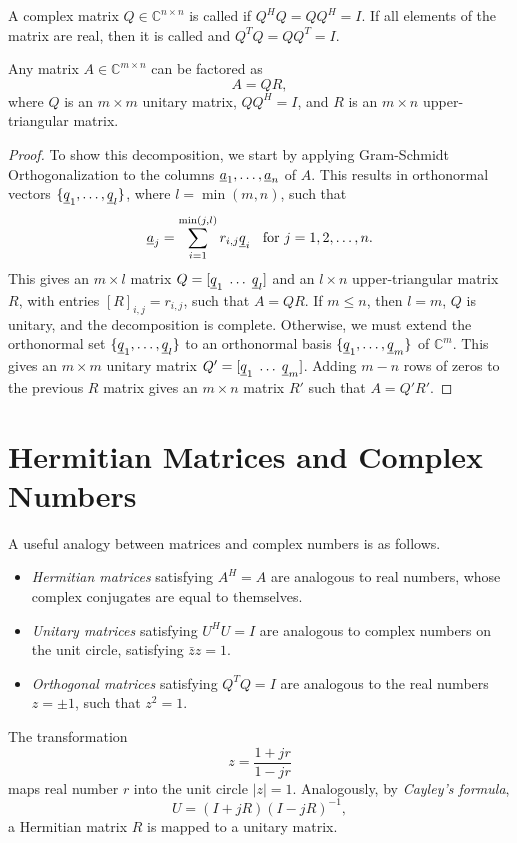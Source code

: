 A complex matrix $Q \in \mathbb{C}^{n \times n}$ is called  if $Q^H Q = Q Q^H = I$.
If all elements of the matrix are real, then it is called  and $Q^T Q = Q Q^T = I$.

\begin{theorem}
Any matrix $A \in \mathbb{C}^{m \times n}$ can be factored as
\begin{equation*}
A = Q R,
\end{equation*}
where $Q$ is an $m\times m$ unitary matrix, $QQ^H = I$, and $R$ is an $m\times n$ upper-triangular matrix.
\end{theorem}
\begin{proof}
To show this decomposition, we start by applying Gram-Schmidt Orthogonalization to the columns $\underline{a}_1,\ldots,\underline{a}_n$ of $A$.
This results in orthonormal vectors $\{ \underline{q}_1,\ldots,\underline{q}_l \}$, where $l=\min(m,n)$, such that
\[ \underline{a}_j = \sum_{i=1}^{\min(j,l)} r_{i,j} \underline{q}_i \;\; \textrm{ for } j=1,2,\ldots,n. \]
This gives an $m\times l$ matrix $Q=[ \underline{q}_1 \; \ldots \; \underline{q}_l ]$ and an $l \times n$ upper-triangular matrix $R$, with entries $[ R ]_{i,j} = r_{i,j}$, such that $A = QR$.
If $m \leq n$, then $l=m$, $Q$ is unitary, and the decomposition is complete.
Otherwise, we must extend the orthonormal set $\{ \underline{q}_1,\ldots,\underline{q}_l \}$ to an orthonormal basis $\{ \underline{q}_1,\ldots,\underline{q}_m \}$ of $\mathbb{C}^m$.
This gives an $m\times m$ unitary matrix $Q' = [ \underline{q}_1 \; \ldots \; \underline{q}_m ]$.
Adding $m-n$ rows of zeros to the previous $R$ matrix gives an $m\times n$ matrix $R'$ such that $A = Q' R'$.
\end{proof}

\section{Hermitian Matrices and Complex Numbers}

A useful analogy between matrices and complex numbers is as follows.
\begin{itemize}
\item \emph{Hermitian matrices} satisfying $A^H = A$ are analogous to real numbers, whose complex conjugates are equal to themselves.
\item \emph{Unitary matrices} satisfying $U^H U = I$ are analogous to complex numbers on the unit circle, satisfying $\bar{z}z = 1$.
\item \emph{Orthogonal matrices} satisfying $Q^TQ = I$ are analogous to the real numbers $z = \pm 1$, such that $z^2 = 1$.
\end{itemize}

The transformation
\begin{equation*}
z = \frac{1 + jr}{1 - jr}
\end{equation*}
maps real number $r$ into the unit circle $|z| = 1$.
Analogously, by \emph{Cayley's formula},
\begin{equation*}
U = (I + jR) (I - jR)^{-1},
\end{equation*}
a Hermitian matrix $R$ is mapped to a unitary matrix.



